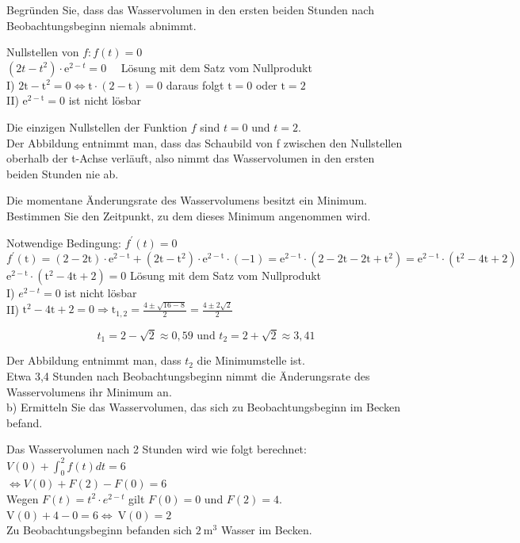 \documentclass[10pt]{article}
\begin{document}
Begründen Sie, dass das Wasservolumen in den ersten beiden Stunden nach Beobachtungsbeginn niemals abnimmt.

Nullstellen von $f: f(t)=0$\\
$\left(2 t-t^{2}\right) \cdot \mathrm{e}^{2-t}=0 \quad$ Lösung mit dem Satz vom Nullprodukt\\
I) $2 \mathrm{t}-\mathrm{t}^{2}=0 \Leftrightarrow \mathrm{t} \cdot(2-\mathrm{t})=0$ daraus folgt $\mathrm{t}=0$ oder $\mathrm{t}=2$\\
II) $\mathrm{e}^{2-\mathrm{t}}=0$ ist nicht lösbar

Die einzigen Nullstellen der Funktion $f$ sind $t=0$ und $t=2$.\\
Der Abbildung entnimmt man, dass das Schaubild von f zwischen den Nullstellen oberhalb der t-Achse verläuft, also nimmt das Wasservolumen in den ersten beiden Stunden nie ab.

Die momentane Änderungsrate des Wasservolumens besitzt ein Minimum. Bestimmen Sie den Zeitpunkt, zu dem dieses Minimum angenommen wird.

Notwendige Bedingung: $f^{\prime}(t)=0$\\
$f^{\prime}(\mathrm{t})=(2-2 \mathrm{t}) \cdot \mathrm{e}^{2-\mathrm{t}}+\left(2 \mathrm{t}-\mathrm{t}^{2}\right) \cdot \mathrm{e}^{2-\mathrm{t}} \cdot(-1)=\mathrm{e}^{2-\mathrm{t}} \cdot\left(2-2 \mathrm{t}-2 \mathrm{t}+\mathrm{t}^{2}\right)=\mathrm{e}^{2-\mathrm{t}} \cdot\left(\mathrm{t}^{2}-4 \mathrm{t}+2\right)$ $\mathrm{e}^{2-\mathrm{t}} \cdot\left(\mathrm{t}^{2}-4 \mathrm{t}+2\right)=0$ Lösung mit dem Satz vom Nullprodukt\\
I) $e^{2-t}=0$ ist nicht lösbar\\
II) $\mathrm{t}^{2}-4 \mathrm{t}+2=0 \Rightarrow \mathrm{t}_{1,2}=\frac{4 \pm \sqrt{16-8}}{2}=\frac{4 \pm 2 \sqrt{2}}{2}$

$$
t_{1}=2-\sqrt{2} \approx 0,59 \text { und } t_{2}=2+\sqrt{2} \approx 3,41
$$

Der Abbildung entnimmt man, dass $t_{2}$ die Minimumstelle ist.\\
Etwa 3,4 Stunden nach Beobachtungsbeginn nimmt die Änderungsrate des Wasservolumens ihr Minimum an.\\
b) Ermitteln Sie das Wasservolumen, das sich zu Beobachtungsbeginn im Becken befand.

Das Wasservolumen nach 2 Stunden wird wie folgt berechnet:\\
$V(0)+\int_{0}^{2} f(t) d t=6$\\
$\Leftrightarrow V(0)+F(2)-F(0)=6$\\
Wegen $F(t)=t^{2} \cdot e^{2-t}$ gilt $F(0)=0$ und $F(2)=4$.\\
$\mathrm{V}(0)+4-0=6 \Leftrightarrow \mathrm{~V}(0)=2$\\
Zu Beobachtungsbeginn befanden sich $2 \mathrm{~m}^{3}$ Wasser im Becken.
\end{document}
